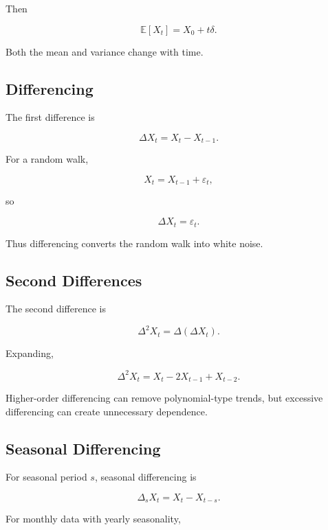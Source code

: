 Then

\[
\boxed{
\mathbb{E}[X_t]
=
X_0+t\delta.
}
\]

Both the mean and variance change with time.

\subsection{Differencing}
\label{subsec:differencing}

The first difference is

\[
\boxed{
\Delta X_t
=
X_t-X_{t-1}.
}
\]

For a random walk,

\[
X_t
=
X_{t-1}
+
\varepsilon_t,
\]

so

\[
\boxed{
\Delta X_t
=
\varepsilon_t.
}
\]

Thus differencing converts the random walk into white noise.

\subsection{Second Differences}
\label{subsec:second-differences}

The second difference is

\[
\boxed{
\Delta^2X_t
=
\Delta
(
\Delta X_t
).
}
\]

Expanding,

\[
\boxed{
\Delta^2X_t
=
X_t
-
2X_{t-1}
+
X_{t-2}.
}
\]

Higher-order differencing can remove polynomial-type trends, but excessive
differencing can create unnecessary dependence.

\subsection{Seasonal Differencing}
\label{subsec:seasonal-differencing}

For seasonal period \(s\), seasonal differencing is

\[
\boxed{
\Delta_sX_t
=
X_t-X_{t-s}.
}
\]

For monthly data with yearly seasonality,

